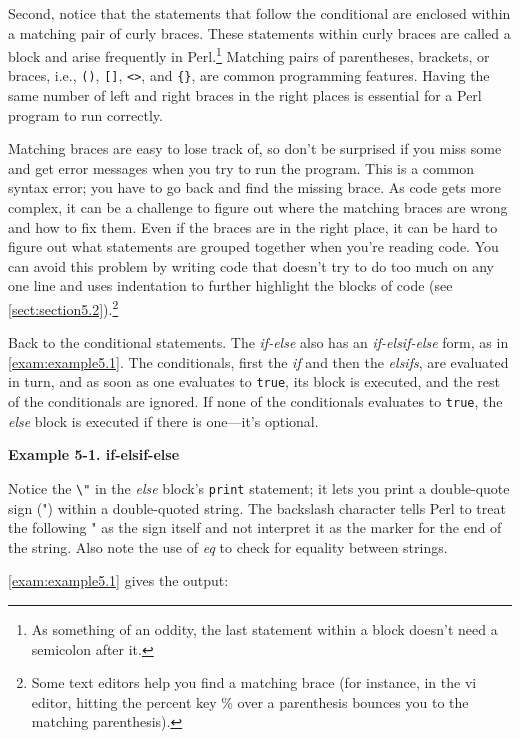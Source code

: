 Second, notice that the statements that follow the conditional are enclosed within a matching pair of curly braces. These statements within curly braces are called a block and arise frequently in Perl.\footnote{As something of an oddity, the last statement within a block doesn't need a semicolon after it.} Matching pairs of parentheses, brackets, or braces, i.e., \verb|()|, \verb|[]|, \verb|<>|, and \verb|{}|, are common programming features. Having the same number of left and right braces in the right places is essential for a Perl program to run correctly.

Matching braces are easy to lose track of, so don't be surprised if you miss some and get error messages when you try to run the program. This is a common syntax error; you have to go back and find the missing brace. As code gets more complex, it can be a challenge to figure out where the matching braces are wrong and how to fix them. Even if the braces are in the right place, it can be hard to figure out what statements are grouped together when you're reading code. You can avoid this problem by writing code that doesn't try to do too much on any one line and uses indentation to further highlight the blocks of code (see \autoref{sect:section5.2}).\footnote{Some text editors help you find a matching brace (for instance, in the vi editor, hitting the percent key \% over a parenthesis bounces you to the matching parenthesis).} 

Back to the conditional statements. The \textit{if-else} also has an \textit{if-elsif-else} form, as in \autoref{exam:example5.1}. The conditionals, first the \textit{if} and then the \textit{elsifs}, are evaluated in turn, and as soon as one evaluates to \verb|true|, its block is executed, and the rest of the conditionals are ignored. If none of the conditionals evaluates to \verb|true|, the \textit{else} block is executed if there is one—it's optional. 

\textbf{Example 5-1. if-elsif-else}


Notice the \verb|\"| in the \textit{else} block's \verb|print| statement; it lets you print a double-quote sign (") within a double-quoted string. The backslash character tells Perl to treat the following " as the sign itself and not interpret it as the marker for the end of the string. Also note the use of \textit{eq} to check for equality between strings.

\autoref{exam:example5.1} gives the output:


